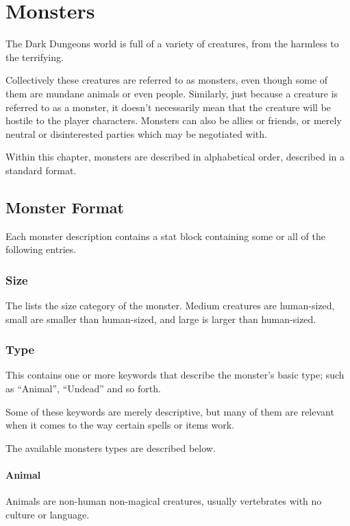 \chapter[purple]{Monsters}
\label{chap:Monsters}
\thispagestyle{plain}

\begin{multicols*}{2}
The Dark Dungeons world is full of a variety of creatures, from the harmless to the terrifying.

Collectively these creatures are referred to as monsters, even though some of them are mundane animals or even people. Similarly, just because a creature is referred to as a monster, it doesn’t necessarily mean that the creature will be hostile to the player characters. Monsters can also be allies or friends, or merely neutral or disinterested parties which may be negotiated with.

Within this chapter, monsters are described in alphabetical order, described in a standard format.

\section{Monster Format}
Each monster description contains a stat block containing some or all of the following entries.

\subsection{Size}
The lists the size category of the monster. Medium creatures are human-sized, small are smaller than human-sized, and large is larger than human-sized.

\subsection{Type}
This contains one or more keywords that describe the monster’s basic type; such as “Animal”, “Undead” and so forth.

Some of these keywords are merely descriptive, but many of them are relevant when it comes to the way certain spells or items work.

The available monsters types are described below.
\subsubsection{Animal}
Animals are non-human non-magical creatures, usually vertebrates with no culture or language.


\end{multicols*}
